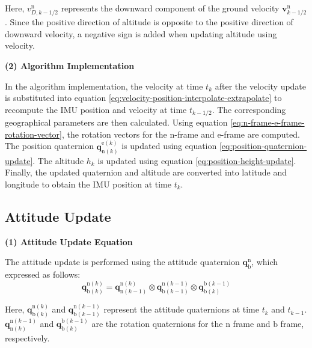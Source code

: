 \documentclass{article}
\begin{document}
Here, ${v}_{D,k-1/2}^{\mathrm{n}}$ represents the downward component of the ground velocity $\boldsymbol{v}_{k-1/2}^{\mathrm{n}}$. Since the positive direction of altitude is opposite to the positive direction of downward velocity, a negative sign is added when updating altitude using velocity.

\textbf{(2) Algorithm Implementation}

In the algorithm implementation, the velocity at time $t_k$ after the velocity update is substituted into equation \eqref{eq:velocity-position-interpolate-extrapolate} to recompute the IMU position and velocity at time $t_{k-1/2}$. The corresponding geographical parameters are then calculated. Using equation \eqref{eq:n-frame-e-frame-rotation-vector}, the rotation vectors for the $\mathrm{n}$-frame and $\mathrm{e}$-frame are computed. The position quaternion $\mathbf{q}_{\mathrm{n}(k)}^{\mathrm{e}(k)}$ is updated using equation \eqref{eq:position-quaternion-update}. The altitude $h_k$ is updated using equation \eqref{eq:position-height-update}. Finally, the updated quaternion and altitude are converted into latitude and longitude to obtain the IMU position at time $t_k$.

\subsection{Attitude Update}

\textbf{(1) Attitude Update Equation}

The attitude update is performed using the attitude quaternion $\mathbf{q}_{\mathrm{b}}^{\mathrm{n}}$, which expressed as follows:
\begin{equation}
    \mathbf{q}_{\mathrm{b}(k)}^{\mathrm{n}(k)} = \mathbf{q}_{\mathrm{n}(k-1)}^{\mathrm{n}(k)} \otimes \mathbf{q}_{\mathrm{b}(k-1)}^{\mathrm{n}(k-1)} \otimes \mathbf{q}_{\mathrm{b}(k)}^{\mathrm{b}(k-1)}
    \label{eq:attitude-quaternion-update}
\end{equation}

Here, $\mathbf{q}_{\mathrm{b}(k)}^{\mathrm{n}(k)}$ and $\mathbf{q}_{\mathrm{b}(k-1)}^{\mathrm{n}(k-1)}$ represent the attitude quaternions at time $t_{k}$ and $t_{k-1}$. $\mathbf{q}_{\mathrm{n}(k)}^{\mathrm{n}(k-1)}$ and $\mathbf{q}_{\mathrm{b}(k)}^{\mathrm{b}(k-1)}$ are the rotation quaternions for the $\mathrm{n}$ frame and $\mathrm{b}$ frame, respectively.
\end{document}
